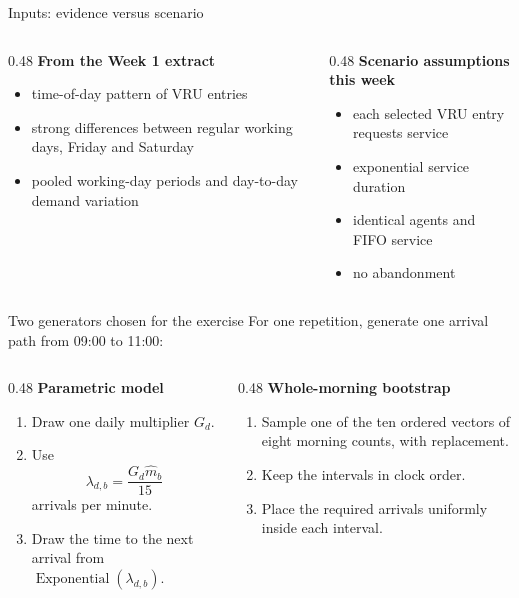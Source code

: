 \documentclass{beamer}
\begin{document}
\begin{frame}{Inputs: evidence versus scenario}
  \begin{columns}[T,onlytextwidth]
    \begin{column}{0.48\textwidth}
      \textbf{From the Week 1 extract}
      \begin{itemize}
        \item time-of-day pattern of VRU entries
        \item strong differences between regular working days, Friday and Saturday
        \item pooled working-day periods and day-to-day demand variation
      \end{itemize}
    \end{column}
    \begin{column}{0.48\textwidth}
      \textbf{Scenario assumptions this week}
      \begin{itemize}
        \item each selected VRU entry requests service
        \item exponential service duration
        \item identical agents and FIFO service
        \item no abandonment
      \end{itemize}
    \end{column}
  \end{columns}
\end{frame}

\begin{frame}{Two generators chosen for the exercise}
  \footnotesize
  For one repetition, generate one arrival path from 09:00 to 11:00:
  \vspace{0.25em}

  \begin{columns}[T,onlytextwidth]
    \begin{column}{0.48\textwidth}
      \textbf{Parametric model}
      \begin{enumerate}
        \item Draw one daily multiplier $G_d$.
        \item Use
          \[
            \lambda_{d,b}=\frac{G_d\widehat m_b}{15}
          \]
          arrivals per minute.
        \item Draw the time to the next arrival from
          $\operatorname{Exponential}(\lambda_{d,b})$.
      \end{enumerate}
    \end{column}
    \begin{column}{0.48\textwidth}
      \textbf{Whole-morning bootstrap}
      \begin{enumerate}
        \item Sample one of the ten ordered vectors of eight morning counts, with replacement.
        \item Keep the intervals in clock order.
        \item Place the required arrivals uniformly inside each interval.
      \end{enumerate}
    \end{column}
  \end{columns}
 \end{frame}
\end{document}
